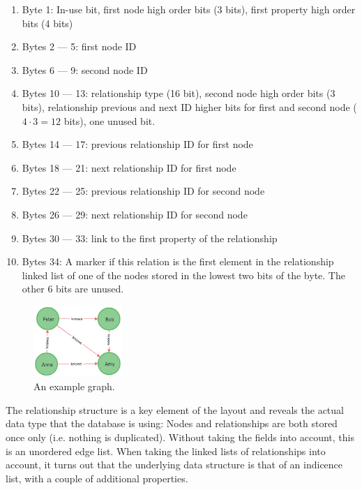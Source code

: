             \begin{enumerate}
                \item Byte 1: In-use bit, first node high order bits (3 bits), first property high order bits (4 bits)
                \item Bytes 2 --- 5: first node ID 
                \item Bytes 6 --- 9: second node ID 
                \item Bytes 10 --- 13: relationship type (16 bit), second node high order bits (3 bits), relationship previous and next ID higher bits for first and second node ($4 \cdot 3 = 12$ bits), one unused bit.
                \item Bytes 14 --- 17: previous relationship ID for first node
                \item Bytes 18 --- 21: next relationship ID for first node
                \item Bytes 22 --- 25: previous relationship ID for second node
                \item Bytes 26 --- 29: next relationship ID for second node
                \item Bytes 30 --- 33: link to the first property of the relationship
                \item Bytes 34: A marker if this relation is the first element in the relationship linked list of one of the nodes stored in the lowest two bits of the byte. 
                The other 6 bits are unused.
            \end{enumerate}
            
            \begin{figure}[htp]
                \begin{center}
                    \includegraphics[keepaspectratio,height=0.4\textheight,width=0.3\textwidth]{img/04-databases/graph.png}
                \end{center}
                \caption{An example graph.}
                \label{n4j-ex-gr}
            \end{figure}
            
            The relationship structure is a key element of the layout and reveals the actual data type that the database is using:
            Nodes and relationships are both stored once only (i.e. nothing is duplicated).
            Without taking the fields into account, this is an unordered edge list.
            When taking the linked lists of relationships into account, it turns out that the underlying data structure is that of an indicence list, with a couple of additional properties.
            

